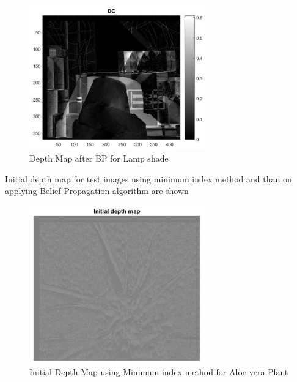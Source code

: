 \begin{figure}[h]
\begin{center}
\includegraphics[width=3in]{dmlamma.eps}
\caption{Depth Map after BP for Lamp shade} \label{lined}
\end{center}
\end{figure}
Initial depth map for test images using minimum index method and than on applying  Belief Propagation algorithm are  shown

\begin{figure}[h]
\begin{center}
\includegraphics[width=3in]{idmMIal.eps}
\caption{Initial Depth Map using Minimum index method for Aloe vera Plant}\label{lined}
\end{center}
\end{figure}



